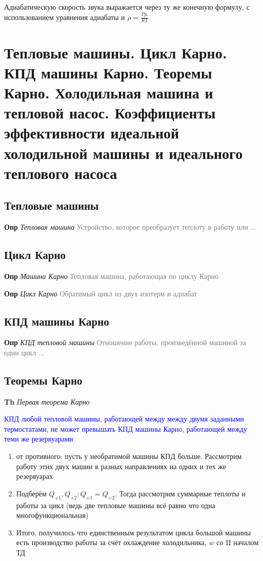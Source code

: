 \documentclass[a4paper, 14pt]{article}
\begin{document}
    Адиабатическую скорость звука выражается через ту же конечную формулу, с использованием уравнения адиабаты и
    $\rho = \frac{P \mu}{RT}$

    \section{Тепловые машины.
    Цикл Карно.
    КПД машины Карно.
    Теоремы Карно.
    Холодильная машина и тепловой насос.
    Коэффициенты эффективности идеальной холодильной машины и идеального теплового насоса}

    \subsection{Тепловые машины}

    \textbf{Опр} \textit{Тепловая машина} \textcolor{gray}{Устройство, которое преобразует теплоту в работу или ...}

    \subsection{Цикл Карно}

    \textbf{Опр} \textit{Машина Карно} \textcolor{gray}{Тепловая машина, работающая по циклу Карно}

    \textbf{Опр} \textit{Цикл Карно} \textcolor{gray}{Обратимый цикл из двух изотерм и адиабат}

    \subsection{КПД машины Карно}

    \textbf{Опр} \textit{КПД тепловой машины} \textcolor{gray}{Отношение работы, произведённой машиной за один цикл ...}

    \subsection{Теоремы Карно}

    \textbf{Th} \textit{Первая теорема Карно}

    \textcolor{blue}{КПД любой тепловой машины, работающей между между двумя заданными термостатами, не может
    превышать КПД машины Карно, работающей между теми же резервуарами}

    \begin{enumerate}
        \item от противного: пусть у необратимой машины КПД больше.
        Рассмотрим работу этих двух машин в разных направлениях на одних и тех же резервуарах
        \item Подберём $Q_{+1}, Q_{+2}: Q_{+1} = Q_{+2}$.
        Тогда рассмотрим суммарные теплоты и работы за цикл (ведь две тепловые машины всё равно что одна
        многофункциональная)
        \item Итого, получилось что единственным результатом цикла большой машины есть производство работы за счёт
        охлаждение холодильника, $w$ со II началом ТД
    \end{enumerate}
\end{document}
